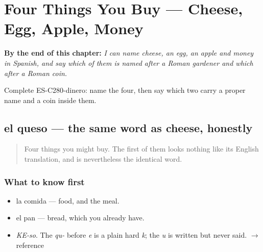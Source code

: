 
\chapter{Four Things You Buy --- Cheese, Egg, Apple, Money}
\label{ch:la-compra}

\begin{chapteropening}
\textbf{By the end of this chapter:} \emph{I can name cheese, an egg, an apple and money in Spanish, and say which of them is named after a Roman gardener and which after a Roman coin.}

Complete ES-C280-dinero: name the four, then say which two carry a proper name and a coin inside them.
\end{chapteropening}

\section[el queso]{el queso — the same word as cheese, honestly}

\label{lesson:ES-C280-queso}



\begin{quote}
Four things you might buy. The first of them looks nothing like its English translation, and is nevertheless the identical word.
\end{quote}

\subsection*{What to know first}
\begin{itemize}
\raggedright
  \item la comida — food, and the meal.
  \item el pan — bread, which you already have.
\end{itemize}

\begin{sounds}
\begin{itemize}
\raggedright
  \item \emph{KE-so}. The \emph{qu-} before \emph{e} is a plain hard \emph{k}; the \emph{u} is written but never said. $\to$ reference
\end{itemize}
\end{sounds}

